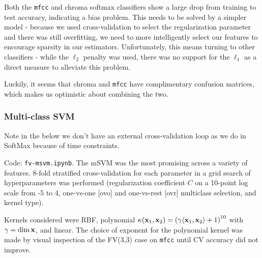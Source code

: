 \documentclass{article}
\begin{document}
Both the \texttt{mfcc} and chroma softmax classifiers show a large drop from training to test accuracy, indicating a bias problem. This needs to be solved by a simpler model - because we used cross-validation to select the regularization parameter and there was still overfitting, we need to more intelligently select our features to encourage sparsity in our estimators. Unfortunately, this means turning to other classifiers - while the $\ell_2$ penalty was used, there was no support for the $\ell_1$ as a direct measure to alleviate this problem.

Luckily, it seems that chroma and \texttt{mfcc} have complimentary confusion matrices, which makes us optimistic about combining the two.

\subsubsection{Multi-class SVM}

Note in the below we don't have an external cross-validation loop as we do in SoftMax because of time constraints.

Code: \texttt{fv-msvm.ipynb}. The mSVM was the most promising across a variety of features. 8-fold stratified cross-validation for each parameter in a grid search of hyperparameters was performed (regularization coefficient $C$ on a 10-point log scale from -5 to 4, one-vs-one [ovo] and one-vs-rest [ovr] multiclass selection, and kernel type).

Kernels considered were RBF, polynomial $\kappa(\textbf{x}_1, \textbf{x}_2)=\left({\gamma\langle \textbf{x}_1,\textbf{x}_2 \rangle+1}\right)^{10}$ with $\gamma=\dim \textbf{x}$, and linear. The choice of exponent for the polynomial kernel was made by visual inspection of the FV(3,3) case on \texttt{mfcc} until CV accuracy did not improve.
\end{document}
